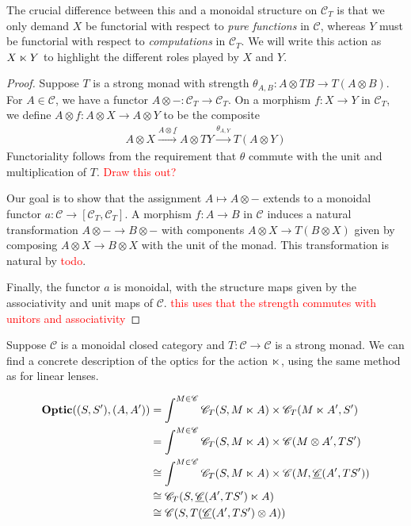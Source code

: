 \documentclass[11pt,a4paper]{article}
\theoremstyle{plain}
\theoremstyle{definition}
\newcommand{\C}{\mathscr{C}}
\newcommand{\homC}{\underline{\C}}
\newcommand{\Optic}{\mathbf{Optic}}
\newcommand{\todo}[1]{\textcolor{red}{\small #1}}
\begin{document}
The crucial difference between this and a monoidal structure on $\C_T$ is that we only demand $X$ be functorial with respect to \emph{pure functions} in $\C$, whereas $Y$ must be functorial with respect to \emph{computations} in $\C_T$. We will write this action as $X \ltimes Y$ to highlight the different roles played by $X$ and $Y$. 

\begin{proof}
Suppose $T$ is a strong monad with strength $\theta_{A, B} : A \otimes T B \to T(A \otimes B)$. For $A \in \C$, we have a functor $A \otimes - : \C_T \to \C_T$. On a morphism $f : X \to Y$ in $\C_T$, we define $A \otimes f : A \otimes X \to A \otimes Y$ to be the composite
\begin{align*}
A \otimes X \xrightarrow{A \otimes \underline{f}} A \otimes TY \xrightarrow{\theta_{A, Y}} T(A \otimes Y)
\end{align*}
Functoriality follows from the requirement that $\theta$ commute with the unit and multiplication of $T$. \todo{Draw this out?}

Our goal is to show that the assignment $A \mapsto A \otimes -$ extends to a monoidal functor $a : \C \to [\C_T, \C_T]$. A morphism $f : A \to B$ in $\C$ induces a natural transformation $A \otimes - \to B \otimes -$ with components $A \otimes X \to T(B \otimes X)$ given by composing $A \otimes X \to B \otimes X$ with the unit of the monad. This transformation is natural by \todo{todo}.

Finally, the functor $a$ is monoidal, with the structure maps given by the associativity and unit maps of $\C$. \todo{this uses that the strength commutes with unitors and associativity}
\end{proof}

Suppose $\C$ is a monoidal closed category and $T : \C \to \C$ is a strong monad. We can find a concrete description of the optics for the action $\ltimes$, using the same method as for linear lenses.

\begin{align*}
\Optic((S, S'), (A, A'))
&= \int^{M \in \C} \C_T(S, M \monact A) \times \C_T(M \monact A', S') \\
&= \int^{M \in \C} \C_T(S, M \monact A) \times \C(M \otimes A', T S') \\
&\cong \int^{M \in \C} \C_T(S, M \monact A) \times \C(M, \homC(A', T S')) \\
&\cong \C_T(S, \homC(A', T S') \monact A) \\
&\cong \C(S, T(\homC(A', T S') \otimes A))
\end{align*}
\end{document}
